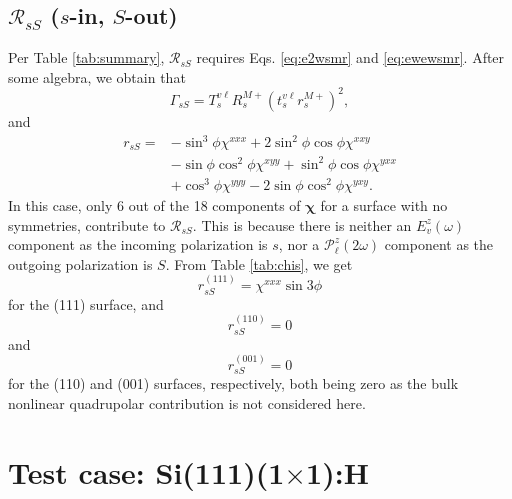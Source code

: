 \documentclass[aps,prb,10pt,showpacs,letterpaper,twocolumn]{revtex4-1}
\begin{document}
\subsection{\texorpdfstring{$\mathcal{R}_{sS}$ ($s$-in, $S$-out)}{RsS (s-in,
S-out)}}
\label{sec:RsS}

Per Table \ref{tab:summary}, $\mathcal{R}_{sS}$ requires Eqs. \eqref{eq:e2wsmr}
and \eqref{eq:ewewsmr}. After some algebra, we obtain that
\begin{equation}
\Gamma_{sS} = 
T_{s}^{v\ell}R^{M+}_{s}\left(t^{v\ell}_{s}r^{M+}_{s}\right)^{2},
\end{equation}
and
\begin{equation}
\begin{split}
r_{sS} = 
&- \sin^{3}\phi\chi^{xxx}
 + 2\sin^{2}\phi\cos\phi\chi^{xxy}\\
&- \sin\phi\cos^{2}\phi\chi^{xyy}
 + \sin^{2}\phi\cos\phi\chi^{yxx}\\
&+ \cos^{3}\phi\chi^{yyy}
 - 2\sin\phi\cos^{2}\phi\chi^{yxy}.
\end{split}
\end{equation}
In this case, only 6 out of the 18 components of $\boldsymbol{\chi}$ for a
surface with no symmetries, contribute to $\mathcal{R}_{sS}$. This is because
there is neither an $E^{z}_v(\omega)$ component as the incoming polarization is
$s$, nor a $\mathcal{P}^{z}_\ell(2\omega)$ component as the outgoing
polarization is $S$. From Table \ref{tab:chis}, we get
\begin{equation}\label{eq:rss111}
r^{(111)}_{sS} = \chi^{xxx}\sin3\phi
\end{equation}
for the (111) surface, and 
\begin{equation}\label{eq:rss110}
r^{(110)}_{sS} = 0
\end{equation}
and
\begin{equation}\label{eq:rss001}
r^{(001)}_{sS} = 0
\end{equation}
for the (110) and (001) surfaces, respectively, both being zero as the bulk
nonlinear quadrupolar contribution is not considered here.\cite{sipePRB87}


\section{Test case:
\texorpdfstring{S\lowercase{i}(111)(1$\times$1):H}{Si(111)(1x1):H}}
\label{sec:example} 
\end{document}
